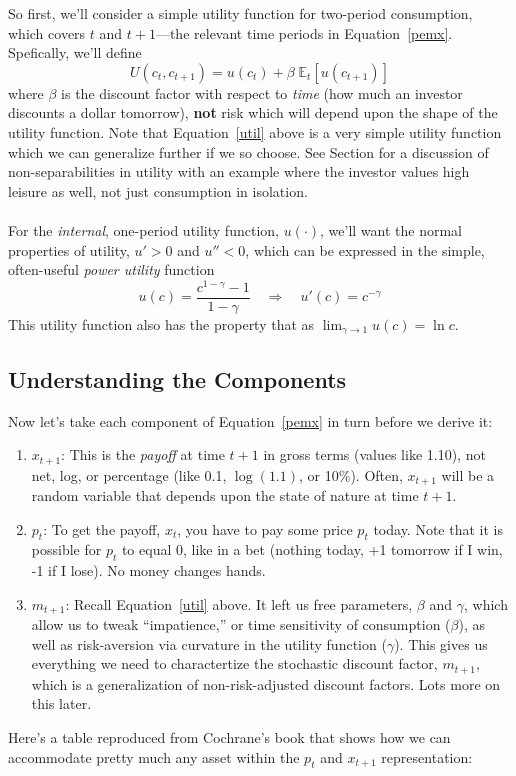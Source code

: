 \documentclass[a4paper,12pt]{scrartcl}
\begin{document}
So first, we'll consider a simple utility function for two-period
consumption, which covers $t$ and $t+1$---the relevant time periods
in Equation~\ref{pemx}. Spefically, we'll define
\begin{equation}
    \label{util}
    U(c_t, c_{t+1}) = u(c_t) + \beta \;\mathbb{E}_t\left[u(c_{t+1})\right]
\end{equation}
where $\beta$ is the discount factor with respect to \emph{time} (how
much an investor discounts a dollar tomorrow), \textbf{not} risk which
will depend upon the shape of the utility function. Note that
Equation~\ref{util} above is a very simple utility function which we can
generalize further if we so choose. See Section for a discussion of
non-separabilities in utility with an example where the investor values
high leisure as well, not just consumption in isolation.
\\
\\
For the \emph{internal}, one-period utility function, $u(\cdot)$, we'll
want the normal properties of utility, $u'>0$ and $u''<0$, which can be
expressed in the simple, often-useful \emph{power utility} function
\begin{equation}
    \label{upwr}
    u(c) = \frac{c^{1-\gamma}-1}{1-\gamma} \quad\Rightarrow\quad
	u'(c) = c^{-\gamma}
\end{equation}
This utility function also has the property that as
$\lim_{\gamma\rightarrow 1}u(c) = \ln c$.

\subsection{Understanding the Components}

Now let's take each component of Equation~\ref{pemx} in turn
before we derive it:
\begin{enumerate}
  \item $x_{t+1}$: This is the \emph{payoff} at time $t+1$ in gross
    terms (values like 1.10), not net, log, or percentage (like 0.1,
    $\log(1.1)$, or 10\%).  Often, $x_{t+1}$ will be a random variable
    that depends upon the state of nature at time $t+1$.

  \item $p_t$: To get the payoff, $x_t$, you have to pay some price
    $p_t$ today. Note that it is possible for $p_t$ to equal 0, like in
    a bet (nothing today, +1 tomorrow if I win, -1 if I lose).  No money
    changes hands.

  \item $m_{t+1}$: Recall Equation~\ref{util} above.  It left us free
    parameters, $\beta$ and $\gamma$, which allow us to tweak
    ``impatience,'' or time sensitivity of consumption ($\beta$), as
    well as risk-aversion via curvature in the utility function
    ($\gamma$).  This gives us everything we need to charactertize the
    stochastic discount factor, $m_{t+1}$, which is a generalization of
    non-risk-adjusted discount factors. Lots more on this later.
\end{enumerate}
Here's a table reproduced from Cochrane's book that shows how we can
accommodate pretty much any asset within the $p_t$ and $x_{t+1}$
representation:
\end{document}
